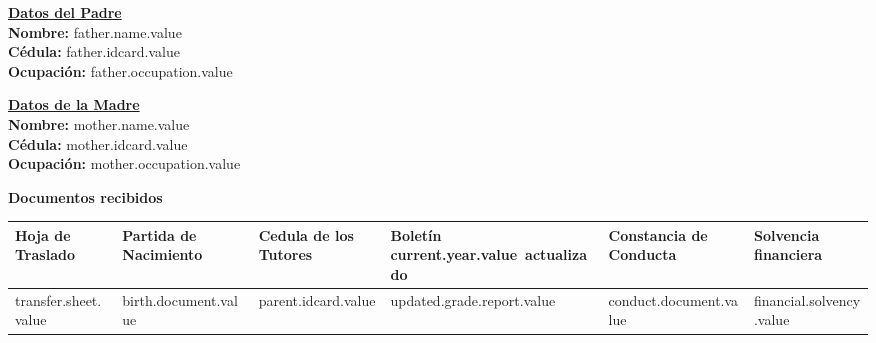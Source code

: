 \documentclass[12pt]{article}
\newcommand{\aField}[1]{#1}
\newcommand{\fatherName}{father.name.value}
\newcommand{\fatherIdcard}{father.idcard.value}
\newcommand{\fatherOccupation}{father.occupation.value}
\newcommand{\motherName}{mother.name.value}
\newcommand{\motherIdcard}{mother.idcard.value}
\newcommand{\motherOccupation}{mother.occupation.value}
\newcommand{\currentYear}{current.year.value}
\newcommand{\transferSheet}{transfer.sheet.value}
\newcommand{\birthDocument}{birth.document.value}
\newcommand{\parentIdcard}{parent.idcard.value}
\newcommand{\updatedGradeReport}{updated.grade.report.value}
\newcommand{\conductDocument}{conduct.document.value}
\newcommand{\financialSolvency}{financial.solvency.value}
\begin{document}
    \par\vspace{4mm}
    \begin{minipage}[t]{0.48\textwidth}
        \textbf{\uline{Datos del Padre}}\\
        \textbf{Nombre:} \aField{\fatherName}\\
        \textbf{Cédula:} \aField{\fatherIdcard}\\
        \textbf{Ocupación:} \aField{\fatherOccupation}
    \end{minipage}
    \hfill
    \begin{minipage}[t]{0.48\textwidth}
        \textbf{\uline{Datos de la Madre}}\\
        \textbf{Nombre:} \aField{\motherName}\\
        \textbf{Cédula:} \aField{\motherIdcard}\\
        \textbf{Ocupación:} \aField{\motherOccupation}
    \end{minipage}   

    \par\vspace{8mm}
    \textbf{Documentos recibidos}
    \begin{table}[H]
        \centering
        \begin{tabular}{|p{1.8cm}|p{2.3cm}|p{2.4cm}|p{2.6cm}|p{2.5cm}|p{2cm}|}
            \hline
            Hoja de Traslado &
            Partida de Nacimiento &
            Cedula de los Tutores &
            Boletín \currentYear\ actualizado &
            Constancia de Conducta &
            Solvencia financiera\\
            \hline
            \hspace{6mm}\transferSheet &
            \hspace{6mm}\birthDocument &
            \hspace{6mm}\parentIdcard &
            \hspace{6mm}\updatedGradeReport &
            \hspace{6mm}\conductDocument &
            \hspace{6mm}\financialSolvency\\
            \hline
        \end{tabular}
    \end{table}
    
\end{document}
